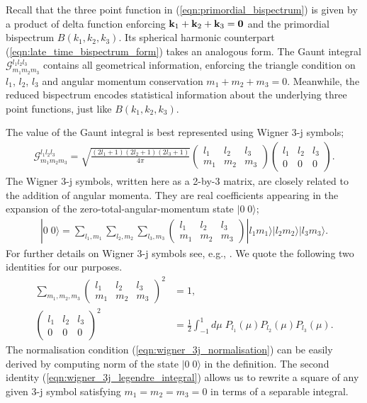 Recall that the three point function in (\ref{eqn:primordial_bispectrum}) is given by a product of delta function enforcing $\mathbf{k}_1 + \mathbf{k}_2 + \mathbf{k}_3 = \mathbf{0}$ and the primordial bispectrum $B(k_1,k_2,k_3)$. Its spherical harmonic counterpart (\ref{eqn:late_time_bispectrum_form}) takes an analogous form. The Gaunt integral $\mathcal{G}^{l_1 l_2 l_3}_{m_1 m_2 m_3}$ contains all geometrical information, enforcing the triangle condition on $l_1$, $l_2$, $l_3$ and angular momentum conservation $m_1+m_2+m_3=0$. Meanwhile, the reduced bispectrum encodes statistical information about the underlying three point functions, just like $B(k_1,k_2,k_3)$.

The value of the Gaunt integral is best represented using Wigner 3-j symbols;
\begin{align}
	\mathcal{G}^{l_1 l_2 l_3}_{m_1 m_2 m_3} = \sqrt{\frac{(2l_1+1)(2l_2+1)(2l_3+1)}{4\pi}} \begin{pmatrix}	l_1 & l_2 & l_3 \\ m_1 & m_2 & m_3 \end{pmatrix} \begin{pmatrix}	l_1 & l_2 & l_3 \\ 0 & 0 & 0 \end{pmatrix}.
\end{align}
The Wigner 3-j symbols, written here as a 2-by-3 matrix, are closely related to the addition of angular momenta. They are real coefficients appearing in the expansion of the zero-total-angular-momentum state $|0 \; 0\rangle$;
\begin{align}
	| 0 \; 0 \rangle = \sum_{l_1,m_1} \sum_{l_2,m_2} \sum_{l_3,m_3} \begin{pmatrix}	l_1 & l_2 & l_3 \\ m_1 & m_2 & m_3 \end{pmatrix} | l_1 m_1 \rangle | l_2 m_2 \rangle | l_3 m_3 \rangle.
\end{align}
For further details on Wigner 3-j symbols see, e.g., \cite{Olver2010nist}. We quote the following two identities for our purposes.
\begin{align}
	\sum_{m_1,m_2,m_3} { \begin{pmatrix}	l_1 & l_2 & l_3 \\ m_1 & m_2 & m_3 \end{pmatrix} }^2 &= 1, \label{eqn:wigner_3j_normalisation} \\
	{ \begin{pmatrix}	l_1 & l_2 & l_3 \\ 0 & 0 & 0 \end{pmatrix} }^2 &= \frac{1}{2} \int_{-1}^{1} d\mu \; P_{l_1}(\mu) P_{l_2}(\mu) P_{l_3}(\mu). \label{eqn:wigner_3j_legendre_integral} 
\end{align}
The normalisation condition (\ref{eqn:wigner_3j_normalisation}) can be easily derived by computing norm of the state $|0 \; 0 \rangle$ in the definition. The second identity (\ref{eqn:wigner_3j_legendre_integral}) allows us to rewrite a square of any given 3-j symbol satisfying $m_1=m_2=m_3=0$ in terms of a separable integral.

